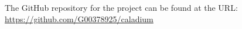 
\begin{appendices}
\renewcommand{\chaptername}{Appendix}
\renewcommand{\thechapter}{A}
\chapter{}
The GitHub repository for the project can be found at the URL: \\
\href{https://github.com/G00378925/caladium}{https://github.com/G00378925/caladium}

\renewcommand{\chaptername}{Appendix}
\renewcommand{\thechapter}{B}
\chapter{}

\label{sec:kanban_table}


\end{appendices}
